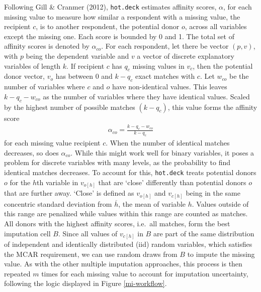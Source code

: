 \documentclass[12pt,econ]{sources/authesis}
\begin{document}
Following Gill \& Cranmer (2012), \texttt{hot.deck} estimates affinity scores, \(\alpha\), for each missing value to measure how similar a respondent with a missing value, the recipient \(c\), is to another respondent, the potential donor \(o\), across all variables except the missing one. Each score is bounded by 0 and 1. The total set of affinity scores is denoted by \(\alpha_{co}\). For each respondent, let there be vector \((p, v)\), with \(p\) being the dependent variable and \(v\) a vector of discrete explanatory variables of length \(k\). If recipient \(c\) has \(q_c\) missing values in \(v_c\), then the potential donor vector, \(v_o\) has between 0 and \(k-q_c\) exact matches with \(c\). Let \(w_{co}\) be the number of variables where \(c\) and \(o\) have non-identical values. This leaves \(k-q_c -w_{co}\) as the number of variables where they have identical values. Scaled by the highest number of possible matches \((k-q_c)\), this value forms the affinity score
\begin{align}
\alpha_{co} = \frac{k-q_c-w_{co}}{k-q_c}
\end{align}
for each missing value recipient \(c\). When the number of identical matches decreases, so does \(\alpha_{co}\). While this might work well for binary variables, it poses a problem for discrete variables with many levels, as the probability to find identical matches decreases. To account for this, \texttt{hot.deck} treats potential donors \(o\) for the \(h\)th variable in \(v_{o[h]}\) that are `close' differently than potential donors \(o\) that are further away. `Close' is defined as \(v_{o[h]}\) and \(v_{c[h]}\) being in the same concentric standard deviation from \(\overline{h}\), the mean of variable \(h\). Values outside of this range are penalized while values within this range are counted as matches. All donors with the highest affinity scores, i.e.~all matches, form the best imputation cell \(B\). Since all values of \(v_{c[h]}\) in \(B\) are part of the same distribution of independent and identically distributed (iid) random variables, which satisfies the MCAR requirement, we can use random draws from \(B\) to impute the missing value. As with the other multiple imputation approaches, this process is then repeated \(m\) times for each missing value to account for imputation uncertainty, following the logic displayed in Figure \ref{mi-workflow}.
\end{document}
